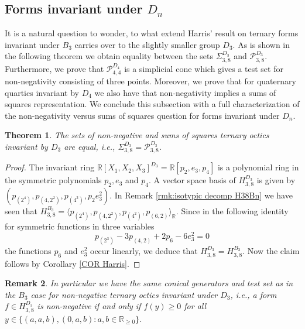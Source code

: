 \documentclass[11pt,a4paper]{amsart}
\numberwithin{equation}{section}
\newtheorem{thm}{Theorem}
\newtheorem{remark}[thm]{Remark}
\theoremstyle{definition}
\newcommand{\R}{\mathbb{R}}
\numberwithin{thm}{section}
\theoremstyle{break}
\numberwithin{subcase}{case}
\begin{document}
\subsection{Forms invariant under $D_n$}\label{secdn}
It is a natural question to wonder, to what extend Harris' result on ternary forms invariant under $B_3$ carries over to the slightly smaller group $D_3$. As is shown in the following theorem we obtain equality between the sets $\Sigma_{3,8}^{D_3}$ and $\mathcal{P}_{3,8}^{D_3}$. Furthermore, we prove that $\mathcal{P}_{4,4}^{D_4}$ is a simplicial cone which gives a test set for non-negativity consisting of three points. Moreover, we prove that for quaternary quartics invariant by $D_4$ we also have that non-negativity implies a sums of squares representation. We conclude this subsection with a full characterization of the non-negativity versus sums of squares question for forms invariant under $D_n$.
\begin{thm}\label{thm:harrisd3}
The sets of non-negative and sums of squares ternary octics invariant by $D_3$ are equal, i.e.,
$\Sigma_{3,8}^{D_3}=\mathcal{P}_{3,8}^{D_3}$.
\end{thm}
\begin{proof}
The invariant ring $\R[X_1,X_2,X_3]^{D_3}=\R[p_2,e_3,p_4]$ is a polynomial ring in the symmetric polynomials $p_2, e_3$ and $p_4$. A vector space basis of $H_{3,8}^{D_3}$ is given by $\left( p_{(2^4)},p_{(4,2^2)},p_{(4^2)},p_{2}e_3^2 \right)$. In Remark \ref{rmk:isotypic decomp H38Bn} we have seen that $H_{3,8}^{B_3} = \langle p_{(2^4)}, p_{(4,2^2)}, p_{(4^2)}, p_{(6,2)} \rangle_\R.$ Since in the following identity for symmetric functions in three variables $$ p_{(2^3)}-3p_{(4,2)}+2p_6-6e_3^2=0 $$ the functions $p_6$ and $e_3^2$ occur linearly, we deduce that $H_{3,8}^{D_3} = H_{3,8}^{B_3}$. Now the claim follows by Corollary \ref{COR Harris}. 
\end{proof}

\begin{remark}
In particular we have the same conical generators and test set as in the $B_3$ case for non-negative ternary octics invariant under $D_3$, i.e., a form $f\in H_{3,8}^{D_3}$ is non-negative if and only if $f(y)\geq 0$ for all $y \in \{ (a,a,b),(0,a,b) : a,b \in \R_{\geq 0} \}$.
\end{remark}
\end{document}
